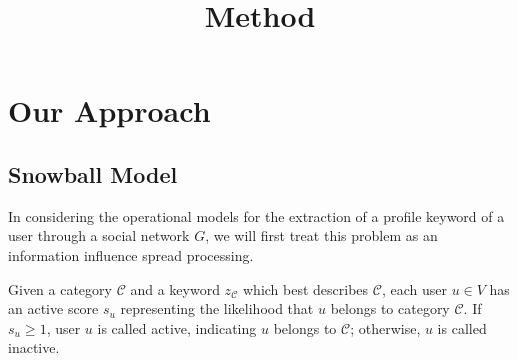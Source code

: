 \documentclass{article}
\begin{document}
\title{Method}

\newcommand{\following}{\ensuremath{following}}
\newcommand{\follower}{\ensuremath{follower}}

\maketitle \else \fi

\section{Our Approach}\label{sec:method}

\subsection{Snowball Model}
In considering the operational models for the extraction of a profile keyword of a user through a social network $G$, we will first treat this problem as an information influence spread processing.

Given a category $\mathcal{C}$ and a keyword $z_{\mathcal{C}}$ which best describes $\mathcal{C}$, each user $u \in V$ has an active score $s_u$ representing the likelihood that $u$ belongs to category $\mathcal{C}$. If $s_u \geq 1$, user $u$ is called active, indicating $u$ belongs to $\mathcal{C}$; otherwise, $u$ is called inactive.

\end{document}
